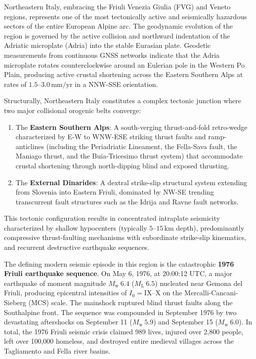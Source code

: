 Northeastern Italy, embracing the Friuli Venezia Giulia (FVG) and Veneto regions, represents one of the most tectonically active and seismically hazardous sectors of the entire European Alpine arc. The geodynamic evolution of the region is governed by the active collision and northward indentation of the Adriatic microplate (Adria) into the stable Eurasian plate. Geodetic measurements from continuous GNSS networks indicate that the Adria microplate rotates counterclockwise around an Eulerian pole in the Western Po Plain, producing active crustal shortening across the Eastern Southern Alps at rates of $1.5\text{--}3.0\,\mathrm{mm/yr}$ in a NNW-SSE orientation.

Structurally, Northeastern Italy constitutes a complex tectonic junction where two major collisional orogenic belts converge:
\begin{enumerate}
  \item The \textbf{Eastern Southern Alps}: A south-verging thrust-and-fold retro-wedge characterized by E-W to WNW-ESE striking thrust faults and ramp-anticlines (including the Periadriatic Lineament, the Fella-Sava fault, the Maniago thrust, and the Buia-Tricesimo thrust system) that accommodate crustal shortening through north-dipping blind and exposed thrusting.
  \item The \textbf{External Dinarides}: A dextral strike-slip structural system extending from Slovenia into Eastern Friuli, dominated by NW-SE trending transcurrent fault structures such as the Idrija and Ravne fault networks.
\end{enumerate}

This tectonic configuration results in concentrated intraplate seismicity characterized by shallow hypocenters (typically $5\text{--}15\,\mathrm{km}$ depth), predominantly compressive thrust-faulting mechanisms with subordinate strike-slip kinematics, and recurrent destructive earthquake sequences.

The defining modern seismic episode in this region is the catastrophic \textbf{1976 Friuli earthquake sequence}. On May 6, 1976, at 20:00:12 UTC, a major earthquake of moment magnitude $M_{\mathrm{w}}~6.4$ ($M_{\mathrm{L}}~6.5$) nucleated near Gemona del Friuli, producing epicentral intensities of $I_0 = \mathrm{IX}\text{--}\mathrm{X}$ on the Mercalli-Cancani-Sieberg (MCS) scale. The mainshock ruptured blind thrust faults along the Southalpine front. The sequence was compounded in September 1976 by two devastating aftershocks on September 11 ($M_{\mathrm{w}}~5.9$) and September 15 ($M_{\mathrm{w}}~6.0$). In total, the 1976 Friuli seismic crisis claimed 989 lives, injured over 2,800 people, left over 100,000 homeless, and destroyed entire medieval villages across the Tagliamento and Fella river basins.


